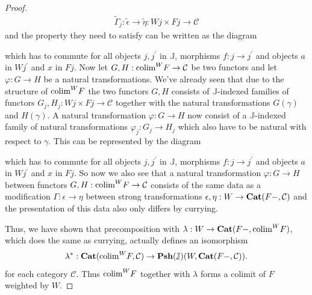 \documentclass[12pt,oneside,reqno,a4paper]{article}
\theoremstyle{definition}
\newcommand{\Cat}{\textbf{\textup{Cat}}}
\newcommand{\Psh}[1]{\textbf{\textup{Psh}}(#1)}
\renewcommand{\tilde}[1]{\widetilde{#1}}
\renewcommand{\phi}{\varphi}
\newcommand{\C}{\mathcal{C}}
\newcommand{\bJ}{\mathbb{J}}
\newcommand{\p}{^\prime}
\newcommand{\colim}{\textup{colim}}
\begin{document}
\begin{proof}
\begin{align*}
\tilde{\Gamma}_j:\tilde{\epsilon}\to\tilde{\eta}:Wj\times Fj\to \C
\end{align*}
and the property they need to satisfy can be written as the diagram
\begin{center}
\end{center}
which has to commute for all objects $j,j\p$ in $\bJ$, morphisms $f:j\to j\p$ and objects $a$ in $Wj\p$ and $x$ in $Fj$. Now let $G,H:\colim^W F\to \C$ be two functors and let $\phi:G\to H$ be a natural transformations. We've already seen that due to the structure of $\colim^W F$ the two functors $G,H$ consists of $\bJ$-indexed families of functors $G_j,H_j:Wj\times Fj\to \C$ together with the natural transformations $G(\gamma)$ and $H(\gamma)$. A natural transformation $\phi:G\to H$ now consist of a $\bJ$-indexed family of natural transformations $\phi_j:G_j\to H_j$ which also have to be natural with respect to $\gamma$. This can be represented by the diagram
\begin{center}
\end{center}
which has to commute for all objects $j,j\p$ in $\bJ$, morphisms $f:j\to j\p$ and objects $a$ in $Wj\p$ and $x$ in $Fj$. So now we also see that a natural transformation $\phi:G\to H$ between functors $G,H:\colim^W F\to \C$ consists of the same data as a modification $\Gamma:\epsilon\to\eta$ between strong transformations $\epsilon,\eta:W\to\Cat(F-,\C)$ and the presentation of this data also only differs by currying.

Thus, we have shown that precomposition with $\lambda:W\to\Cat(F-,\colim^W F)$, which does the same as currying, actually defines an isomorphism
\begin{align*}
\lambda^*:\Cat(\colim^W F,\C)\to \Psh{\bJ}(W,\Cat(F-,\C)).
\end{align*}
for each category $\C$. Thus $\colim^W F$ together with $\lambda$ forms a colimit of $F$ weighted by $W$.
\end{proof}
\end{document}
